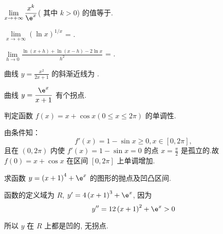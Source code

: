\begin{problem} $\displaystyle \lim\limits_{x \rightarrow + \infty}\frac{x^{k}}{\e^{x}}$( 其中
$k > 0$) 的值等于.

\end{problem}

\begin{problem} $\displaystyle {\lim\limits_{x \rightarrow + \infty}\left( \ln x \right)}^{1/x}$
= .

\end{problem}

\begin{problem}
$\displaystyle \lim\limits_{h \rightarrow 0}\frac{\ln\left( x + h \right) + \ln\left( x - h \right) - 2\ln x}{h^{2}}$
= .

\end{problem}

\begin{problem} 曲线 $\displaystyle y = \frac{x^{2}}{2x + 1}$ 的斜渐近线为
.

\end{problem}

\begin{problem}
曲线 $\displaystyle y = \frac{\e^{x}}{x + 1}$ 有个拐点.



\end{problem}


\begin{problem} 判定函数
$f\left( x \right) = x + \cos x\left( 0 \leq x \leq 2\pi \right)$
的单调性.

\begin{solution}
由条件知：$$f'\left( x \right) = 1 - \sin x \geq 0,x \in \left\lbrack 0,2\pi \right\rbrack,$$
且在 $\left( 0,2\pi \right)$ 内使
$f'\left( x \right) = 1 - \sin x = 0$ 的点 $\displaystyle x = \frac{\pi}{2}$
是孤立的.故 $f\left( 0 \right) = x + \cos x$ 在区间
$\left\lbrack 0,2\pi \right\rbrack$ 上单调增加.

\end{solution}
\end{problem}

\begin{problem} 求函数 $y = \left( x + 1 \right)^{4} + \e^{x}$
的图形的抛点及凹凸区间.

\begin{solution} 函数的定义域为 $R$, $y' = 4\left( x + 1 \right)^{3} + \e^{x}$,
因为
$$y'' = 12\left( x + 1 \right)^{2} + \e^{x} > 0$$

所以 $y$ 在 $R$ 上都是凹的, 无拐点.

\end{solution}
\end{problem}

